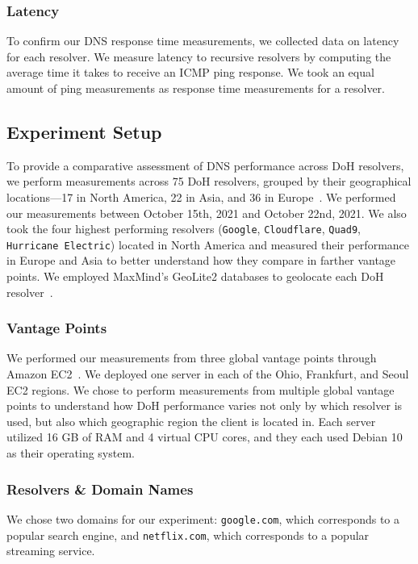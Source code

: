 \subsubsection{Latency}
To confirm our DNS response time measurements, we collected data on latency for each resolver. 
We measure latency to recursive resolvers by computing the average time it takes to receive an ICMP ping response.
We took an equal amount of ping measurements as response time measurements for a resolver.

\subsection{Experiment Setup}
To provide a comparative assessment of DNS performance across DoH resolvers, we perform measurements across 75 DoH resolvers, grouped by their geographical locations—17 in North America, 22 in Asia, and 36 in Europe~\cite{dnscrypt}.
We performed our measurements between October 15th, 2021 and October 22nd, 2021.
We also took the four highest performing resolvers (\texttt{Google}, \texttt{Cloudflare}, \texttt{Quad9}, \texttt{Hurricane Electric}) located in North America and measured their performance in Europe and Asia to better understand how they compare in farther vantage points.  
We employed MaxMind's GeoLite2 databases to geolocate each DoH resolver~\cite{maxmind}.

\subsubsection{Vantage Points}
We performed our measurements from three global vantage points through Amazon EC2~\cite{amazon_ec2}.
We deployed one server in each of the Ohio, Frankfurt, and Seoul EC2 regions.
We chose to perform measurements from multiple global vantage points to understand how DoH performance varies not only by which resolver is used, but also which geographic region the client is located in.
Each server utilized 16 GB of RAM and 4 virtual CPU cores, and they each used Debian 10 as their operating system.

\subsubsection{Resolvers \& Domain Names}
We chose two domains for our experiment: \texttt{google.com}, which corresponds to a popular search engine, and \texttt{netflix.com}, which corresponds to a popular streaming service.

